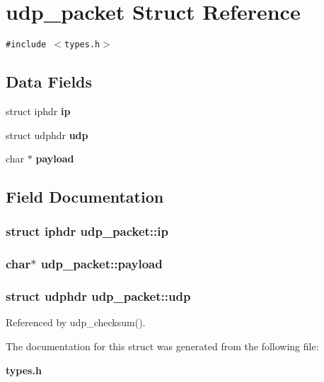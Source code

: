 \section{udp\_\-packet Struct Reference}
\label{structudp__packet}
{\tt \#include $<$types.h$>$}

\subsection*{Data Fields}
\begin{CompactItemize}
\item 
struct iphdr {\bf ip}
\item 
struct udphdr {\bf udp}
\item 
char $\ast$ {\bf payload}
\end{CompactItemize}


\subsection{Field Documentation}
\subsubsection[{ip}]{\setlength{\rightskip}{0pt plus 5cm}struct iphdr {\bf udp\_\-packet::ip}\hspace{0.3cm}{\tt  [read]}}\label{structudp__packet_4950e5cdfee4b24336fbc143531c765e}


\subsubsection[{payload}]{\setlength{\rightskip}{0pt plus 5cm}char$\ast$ {\bf udp\_\-packet::payload}}\label{structudp__packet_8ed712723a01dad866a5e1a0dec391b4}


\subsubsection[{udp}]{\setlength{\rightskip}{0pt plus 5cm}struct udphdr {\bf udp\_\-packet::udp}\hspace{0.3cm}{\tt  [read]}}\label{structudp__packet_372a569cfc3da04ad0612c839e8177ac}




Referenced by udp\_\-checksum().

The documentation for this struct was generated from the following file:\begin{CompactItemize}
\item 
{\bf types.h}\end{CompactItemize}
